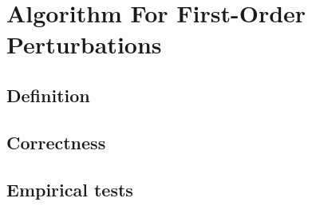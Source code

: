 
\section{Algorithm For First-Order Perturbations}\label{sec:first-order-perturbations}
%
%
\subsection{Definition}\label{subsec:first-order-perturbations-definition}
%
%
%
\subsection{Correctness}\label{subsec:first-order-perturbations-correctness}
%
%
\subsection{Empirical tests}\label{subsec:first-order-perturbations-empirical-tests}
%
%
